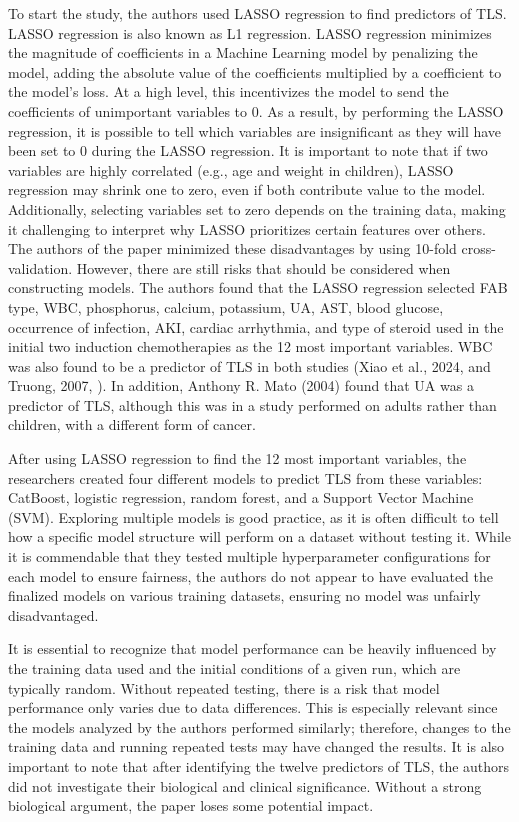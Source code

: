 \documentclass{article}
\begin{document}
To start the study, the authors used LASSO regression to find predictors of TLS. LASSO regression is also known as L1 regression. LASSO regression minimizes the magnitude of coefficients in a Machine Learning model by penalizing the model, adding the absolute value of the coefficients multiplied by a coefficient to the model's loss. At a high level, this incentivizes the model to send the coefficients of unimportant variables to 0. As a result, by performing the LASSO regression, it is possible to tell which variables are insignificant as they will have been set to 0 during the LASSO regression. It is important to note that if two variables are highly correlated (e.g., age and weight in children), LASSO regression may shrink one to zero, even if both contribute value to the model.
Additionally, selecting variables set to zero depends on the training data, making it challenging to interpret why LASSO prioritizes certain features over others. The authors of the paper minimized these disadvantages by using 10-fold cross-validation. However, there are still risks that should be considered when constructing models. The authors found that the LASSO regression selected FAB type, WBC, phosphorus, calcium, potassium, UA, AST, blood glucose, occurrence of infection, AKI, cardiac arrhythmia, and type of steroid used in the initial two induction chemotherapies as the 12 most important variables. WBC was also found to be a predictor of TLS in both studies (Xiao et al., 2024, \cite{xiao2024prediction} and Truong, 2007, \cite{truong2007features}). In addition, Anthony R. Mato (2004) found that UA was a predictor of TLS, although this was in a study performed on adults rather than children, with a different form of cancer.

After using LASSO regression to find the 12 most important variables, the researchers created four different models to predict TLS from these variables: CatBoost, logistic regression, random forest, and a Support Vector Machine (SVM). Exploring multiple models is good practice, as it is often difficult to tell how a specific model structure will perform on a dataset without testing it. While it is commendable that they tested multiple hyperparameter configurations for each model to ensure fairness, the authors do not appear to have evaluated the finalized models on various training datasets, ensuring no model was unfairly disadvantaged. 

 It is essential to recognize that model performance can be heavily influenced by the training data used and the initial conditions of a given run, which are typically random. Without repeated testing, there is a risk that model performance only varies due to data differences. This is especially relevant since the models analyzed by the authors performed similarly; therefore, changes to the training data and running repeated tests may have changed the results.
It is also important to note that after identifying the twelve predictors of TLS, the authors did not investigate their biological and clinical significance. Without a strong biological argument, the paper loses some potential impact.
\end{document}
